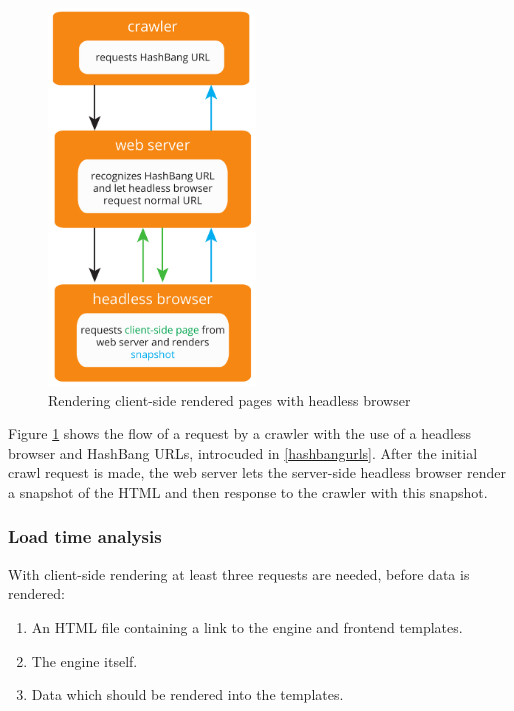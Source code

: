 \begin{figure}[H]
\centering
\includegraphics[height=10cm]{images/frontend_snapshots.pdf}
\caption[frontend_snapshots]{Rendering client-side rendered pages with headless browser}
\label{fig:frontend_snapshots}
\end{figure}

\noindent{}Figure \ref{fig:frontend_snapshots} shows the flow of a request by a crawler with the use of a headless browser and HashBang URLs, introcuded in \ref{hashbangurls}.
After the initial crawl request is made, the web server lets the server-side headless browser render a snapshot of the HTML and then response to the crawler with this snapshot.

\subsubsection{Load time analysis}
With client-side rendering at least three requests are needed, before data is rendered:
\begin{enumerate}
    \item An HTML file containing a link to the \ajax{} engine and frontend templates.
    \item The \ajax{} engine itself.
    \item Data which should be rendered into the templates.
\end{enumerate}

